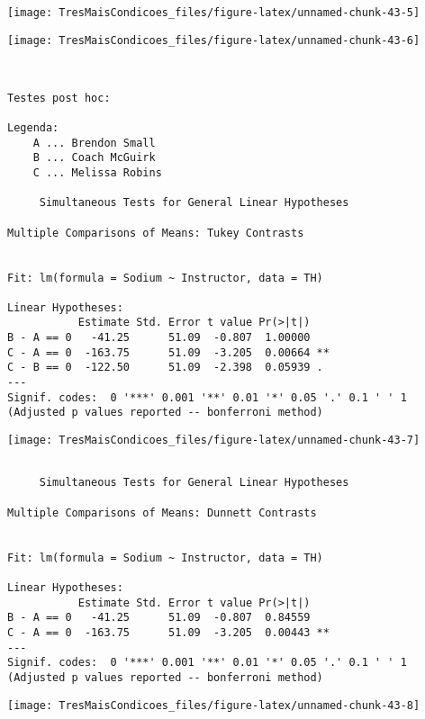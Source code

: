 \documentclass[]{article}
\begin{document}
\begin{center}\texttt{[image: TresMaisCondicoes\_files/figure-latex/unnamed-chunk-43-5]} \end{center}

\begin{center}\texttt{[image: TresMaisCondicoes\_files/figure-latex/unnamed-chunk-43-6]} \end{center}

\begin{verbatim}


Testes post hoc:

Legenda:
    A ... Brendon Small
    B ... Coach McGuirk
    C ... Melissa Robins

     Simultaneous Tests for General Linear Hypotheses

Multiple Comparisons of Means: Tukey Contrasts


Fit: lm(formula = Sodium ~ Instructor, data = TH)

Linear Hypotheses:
           Estimate Std. Error t value Pr(>|t|)   
B - A == 0   -41.25      51.09  -0.807  1.00000   
C - A == 0  -163.75      51.09  -3.205  0.00664 **
C - B == 0  -122.50      51.09  -2.398  0.05939 . 
---
Signif. codes:  0 '***' 0.001 '**' 0.01 '*' 0.05 '.' 0.1 ' ' 1
(Adjusted p values reported -- bonferroni method)
\end{verbatim}

\begin{center}\texttt{[image: TresMaisCondicoes\_files/figure-latex/unnamed-chunk-43-7]} \end{center}

\begin{verbatim}

     Simultaneous Tests for General Linear Hypotheses

Multiple Comparisons of Means: Dunnett Contrasts


Fit: lm(formula = Sodium ~ Instructor, data = TH)

Linear Hypotheses:
           Estimate Std. Error t value Pr(>|t|)   
B - A == 0   -41.25      51.09  -0.807  0.84559   
C - A == 0  -163.75      51.09  -3.205  0.00443 **
---
Signif. codes:  0 '***' 0.001 '**' 0.01 '*' 0.05 '.' 0.1 ' ' 1
(Adjusted p values reported -- bonferroni method)
\end{verbatim}

\begin{center}\texttt{[image: TresMaisCondicoes\_files/figure-latex/unnamed-chunk-43-8]} \end{center}
\end{document}
